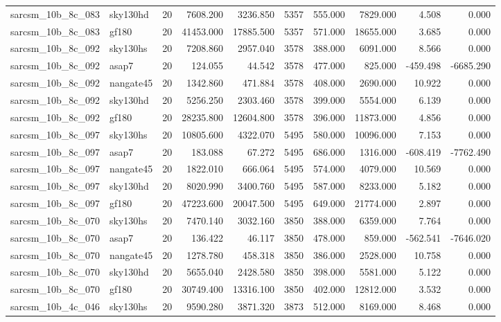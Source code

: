 \documentclass{article}
\begin{document}
\begin{longtable}{llrrrrrrrr}
sarcsm\_10b\_8c\_083 & sky130hd & 20 & 7608.200 & 3236.850 & 5357 & 555.000 & 7829.000 & 4.508 & 0.000 \\
sarcsm\_10b\_8c\_083 & gf180 & 20 & 41453.000 & 17885.500 & 5357 & 571.000 & 18655.000 & 3.685 & 0.000 \\
sarcsm\_10b\_8c\_092 & sky130hs & 20 & 7208.860 & 2957.040 & 3578 & 388.000 & 6091.000 & 8.566 & 0.000 \\
sarcsm\_10b\_8c\_092 & asap7 & 20 & 124.055 & 44.542 & 3578 & 477.000 & 825.000 & -459.498 & -6685.290 \\
sarcsm\_10b\_8c\_092 & nangate45 & 20 & 1342.860 & 471.884 & 3578 & 408.000 & 2690.000 & 10.922 & 0.000 \\
sarcsm\_10b\_8c\_092 & sky130hd & 20 & 5256.250 & 2303.460 & 3578 & 399.000 & 5554.000 & 6.139 & 0.000 \\
sarcsm\_10b\_8c\_092 & gf180 & 20 & 28235.800 & 12604.800 & 3578 & 396.000 & 11873.000 & 4.856 & 0.000 \\
sarcsm\_10b\_8c\_097 & sky130hs & 20 & 10805.600 & 4322.070 & 5495 & 580.000 & 10096.000 & 7.153 & 0.000 \\
sarcsm\_10b\_8c\_097 & asap7 & 20 & 183.088 & 67.272 & 5495 & 686.000 & 1316.000 & -608.419 & -7762.490 \\
sarcsm\_10b\_8c\_097 & nangate45 & 20 & 1822.010 & 666.064 & 5495 & 574.000 & 4079.000 & 10.569 & 0.000 \\
sarcsm\_10b\_8c\_097 & sky130hd & 20 & 8020.990 & 3400.760 & 5495 & 587.000 & 8233.000 & 5.182 & 0.000 \\
sarcsm\_10b\_8c\_097 & gf180 & 20 & 47223.600 & 20047.500 & 5495 & 649.000 & 21774.000 & 2.897 & 0.000 \\
sarcsm\_10b\_8c\_070 & sky130hs & 20 & 7470.140 & 3032.160 & 3850 & 388.000 & 6359.000 & 7.764 & 0.000 \\
sarcsm\_10b\_8c\_070 & asap7 & 20 & 136.422 & 46.117 & 3850 & 478.000 & 859.000 & -562.541 & -7646.020 \\
sarcsm\_10b\_8c\_070 & nangate45 & 20 & 1278.780 & 458.318 & 3850 & 386.000 & 2528.000 & 10.758 & 0.000 \\
sarcsm\_10b\_8c\_070 & sky130hd & 20 & 5655.040 & 2428.580 & 3850 & 398.000 & 5581.000 & 5.122 & 0.000 \\
sarcsm\_10b\_8c\_070 & gf180 & 20 & 30749.400 & 13316.100 & 3850 & 402.000 & 12812.000 & 3.532 & 0.000 \\
sarcsm\_10b\_4c\_046 & sky130hs & 20 & 9590.280 & 3871.320 & 3873 & 512.000 & 8169.000 & 8.468 & 0.000 \\

\end{longtable}
\end{document}
